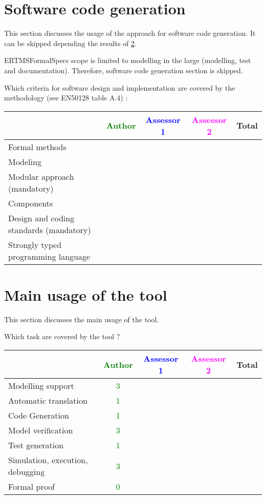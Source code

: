\begin{author_comment}
\section{Software code generation}
This section discusses the usage of the approach for software code generation.
It can be skipped depending the results of \ref{main_usage}.

\begin{author_comment}
ERTMSFormalSpecs scope is limited to modelling in the large (modelling, test and documentation). Therefore, software code generation section is skipped.  
\end{author_comment}

Which criteria for software design and implementation are covered by the methodology
(see EN50128 table A.4) :

\begin{tabular}{|l | c | c | c | c|}
\hline
& \textcolor{green}{Author} & \textcolor{blue}{Assessor 1} & \textcolor{magenta}{Assessor 2} & Total \\
\hline
Formal methods  & & & &  \\
\hline 
Modeling  & & & &  \\
\hline
Modular approach (mandatory) & & & &  \\
\hline
Components & & & &  \\
\hline
Design and coding standards (mandatory) & & & &  \\
\hline
Strongly typed programming language & & & &  \\
\hline

\end{tabular}



\section{Main usage of the tool}
\label{main_usage}

This section discusses the main usage of the tool.

Which task are covered by the tool ?


\begin{tabular}{|l | c | c | c | c|}
\hline
& \textcolor{green}{Author} & \textcolor{blue}{Assessor 1} & \textcolor{magenta}{Assessor 2} & Total \\
\hline 
Modelling support & \textcolor{green}{3} & & &  \\
\hline
Automatic translation  & \textcolor{green}{1} & & & \\
\hline
Code Generation  & \textcolor{green}{1} & & & \\
\hline
Model verification & \textcolor{green}{3} & & & \\
\hline
Test generation & \textcolor{green}{1} & & & \\
\hline
Simulation, execution, debugging & \textcolor{green}{3} & & & \\
\hline
Formal proof & \textcolor{green}{0} & & & \\
\hline
\end{tabular}


\end{author_comment}
